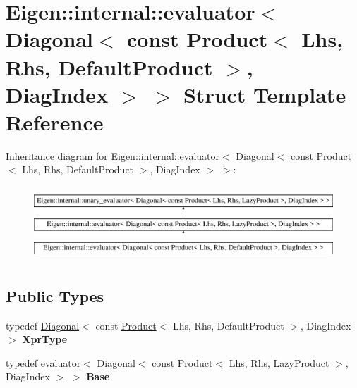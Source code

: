 \hypertarget{struct_eigen_1_1internal_1_1evaluator_3_01_diagonal_3_01const_01_product_3_01_lhs_00_01_rhs_00_0f2daf8d0d705abfd9eae463424f3e8d5}{}\section{Eigen\+::internal\+::evaluator$<$ Diagonal$<$ const Product$<$ Lhs, Rhs, Default\+Product $>$, Diag\+Index $>$ $>$ Struct Template Reference}
\label{struct_eigen_1_1internal_1_1evaluator_3_01_diagonal_3_01const_01_product_3_01_lhs_00_01_rhs_00_0f2daf8d0d705abfd9eae463424f3e8d5}
Inheritance diagram for Eigen\+::internal\+::evaluator$<$ Diagonal$<$ const Product$<$ Lhs, Rhs, Default\+Product $>$, Diag\+Index $>$ $>$\+:\begin{figure}[H]
\begin{center}
\leavevmode
\includegraphics[height=2.823529cm]{struct_eigen_1_1internal_1_1evaluator_3_01_diagonal_3_01const_01_product_3_01_lhs_00_01_rhs_00_0f2daf8d0d705abfd9eae463424f3e8d5}
\end{center}
\end{figure}
\subsection*{Public Types}
\begin{DoxyCompactItemize}
\item 
\mbox{\label{struct_eigen_1_1internal_1_1evaluator_3_01_diagonal_3_01const_01_product_3_01_lhs_00_01_rhs_00_0f2daf8d0d705abfd9eae463424f3e8d5_a56ebe6e1b79efc2cb45b9b7c3420de62}} 
typedef \mbox{\hyperlink{class_eigen_1_1_diagonal}{Diagonal}}$<$ const \mbox{\hyperlink{class_eigen_1_1_product}{Product}}$<$ Lhs, Rhs, Default\+Product $>$, Diag\+Index $>$ {\bfseries Xpr\+Type}
\item 
\mbox{\label{struct_eigen_1_1internal_1_1evaluator_3_01_diagonal_3_01const_01_product_3_01_lhs_00_01_rhs_00_0f2daf8d0d705abfd9eae463424f3e8d5_a898caa7c9189bdf80c2a9c89ec99fcc6}} 
typedef \mbox{\hyperlink{struct_eigen_1_1internal_1_1evaluator}{evaluator}}$<$ \mbox{\hyperlink{class_eigen_1_1_diagonal}{Diagonal}}$<$ const \mbox{\hyperlink{class_eigen_1_1_product}{Product}}$<$ Lhs, Rhs, Lazy\+Product $>$, Diag\+Index $>$ $>$ {\bfseries Base}
\end{DoxyCompactItemize}
